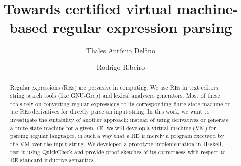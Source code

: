 \documentclass[sigplan]{acmart}
\theoremstyle{definition}
\begin{document}
\title{Towards certified virtual machine-based regular expression parsing}

\author{Thales Ant\^onio Delfino}
\author{Rodrigo Ribeiro}
\begin{abstract}
Regular expressions (REs) are pervasive in computing. We use REs in text editors, string search tools
(like GNU-Grep) and lexical analysers generators. Most of these tools rely on converting regular
expressions to its corresponding finite state machine or use REs derivatives for directly parse an
input string. In this work, we want to investigate the suitability of another approach: instead of
using derivatives or generate a finite state machine for a given RE, we will develop a virtual machine
(VM) for parsing regular languages, in such a way that a RE is merely a program executed by the VM
over the input string. We developed a prototype implementation in Haskell, test it using QuickCheck and
provide proof sketches of its correctness with respect to RE standard inductive semantics.
\end{abstract}
\end{document}
